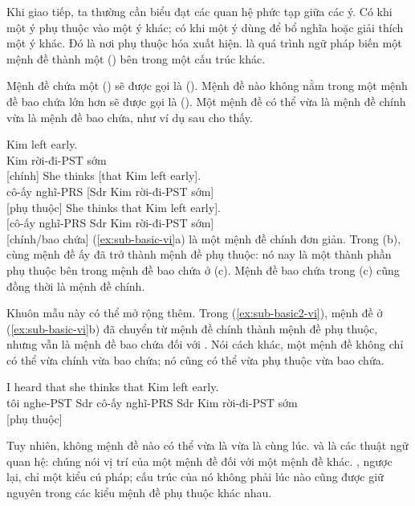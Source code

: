 Khi giao tiếp, ta thường cần biểu đạt các quan hệ phức tạp giữa các ý. Có khi một ý phụ thuộc vào một ý khác; có khi một ý dùng để bổ nghĩa hoặc giải thích một ý khác. Đó là nơi phụ thuộc hóa xuất hiện.  là quá trình ngữ pháp biến một mệnh đề thành một  () bên trong một cấu trúc khác.

Mệnh đề chứa một  () sẽ được gọi là  (). Mệnh đề nào không nằm trong một mệnh đề bao chứa lớn hơn sẽ được gọi là  (). Một mệnh đề có thể vừa là mệnh đề chính vừa là mệnh đề bao chứa, như ví dụ sau cho thấy.

\ea \label{ex:sub-basic-vi}
    \ea \gll Kim left early.\\
        Kim rời-đi-PST sớm\\
    \glt {} [chính]
    \ex \gll She thinks {[}that Kim left early{]}.\\
        cô-ấy nghĩ-PRS {[}Sdr Kim rời-đi-PST sớm{]}\\
    \glt {} [phụ thuộc]
    \ex \gll {[}She thinks that Kim left early{]}.\\
        {[}cô-ấy nghĩ-PRS Sdr Kim rời-đi-PST sớm{]}\\
    \glt {} [chính/bao chứa]
    \z
\z
(\ref{ex:sub-basic-vi}a) là một mệnh đề chính đơn giản. Trong (b), cùng mệnh đề ấy đã trở thành mệnh đề phụ thuộc: nó nay là một thành phần phụ thuộc bên trong mệnh đề bao chứa ở (c). Mệnh đề bao chứa trong (c) cũng đồng thời là mệnh đề chính.

Khuôn mẫu này có thể mở rộng thêm. Trong (\ref{ex:sub-basic2-vi}), mệnh đề ở (\ref{ex:sub-basic-vi}b) đã chuyển từ mệnh đề chính thành mệnh đề phụ thuộc, nhưng vẫn là mệnh đề bao chứa đối với . Nói cách khác, một mệnh đề không chỉ có thể vừa chính vừa bao chứa; nó cũng có thể vừa phụ thuộc vừa bao chứa.

\ea\label{ex:sub-basic2-vi}
\gll I heard {\ob}that she thinks {\ob}that Kim left early{\cb}{\cb}.\\
    tôi nghe-PST Sdr cô-ấy nghĩ-PRS Sdr Kim rời-đi-PST sớm\\
\glt {} [phụ thuộc]
\z

Tuy nhiên, không mệnh đề nào có thể vừa là  vừa là  cùng lúc.  và  là các thuật ngữ quan hệ: chúng nói vị trí của một mệnh đề đối với một mệnh đề khác. , ngược lại, chỉ một kiểu cú pháp; cấu trúc của nó không phải lúc nào cũng được giữ nguyên trong các kiểu mệnh đề phụ thuộc khác nhau.

